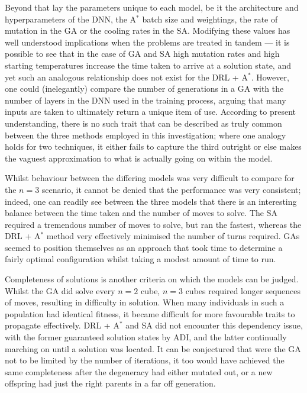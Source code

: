 \documentclass[UKenglish]{svproc}
\begin{document}
Beyond that lay the parameters unique to each model, be it the architecture and hyperparameters of the DNN, the A$^{\ast}$ batch size and weightings, the rate of mutation in the GA or the cooling rates in the SA. Modifying these values has well understood implications when the problems are treated in tandem --- it is possible to see that in the case of GA and SA high mutation rates and high starting temperatures increase the time taken to arrive at a solution state, and yet such an analogous relationship does not exist for the DRL + A$^{\ast}$. However, one could (inelegantly) compare the number of generations in a GA with the number of layers in the DNN used in the training process, arguing that many inputs are taken to ultimately return a unique item of use. According to present understanding, there is no such trait that can be described as truly common between the three methods employed in this investigation; where one analogy holds for two techniques, it either fails to capture the third outright or else makes the vaguest approximation to what is actually going on within the model.

Whilst behaviour between the differing models was very difficult to compare for the $n=3$ scenario, it cannot be denied that the performance was very consistent; indeed, one can readily see between the three models that there is an interesting balance between the time taken and the number of moves to solve. The SA required a tremendous number of moves to solve, but ran the fastest, whereas the DRL + A$^{\ast}$ method very effectively minimised the number of turns required. GAs seemed to position themselves as an approach that took time to determine a fairly optimal configuration whilst taking a modest amount of time to run.

Completeness of solutions is another criteria on which the models can be judged. Whilst the GA did solve every $n=2$ cube, $n=3$ cubes required longer sequences of moves, resulting in difficulty in solution. When many individuals in such a population had identical fitness, it became difficult for more favourable traits to propagate effectively. DRL + A$^{\ast}$ and SA did not encounter this dependency issue, with the former guaranteed solution states by ADI, and the latter continually marching on until a solution was located. It can be conjectured that were the GA not to be limited by the number of iterations, it too would have achieved the same completeness after the degeneracy had either mutated out, or a new offspring had just the right parents in a far off generation.
\end{document}
